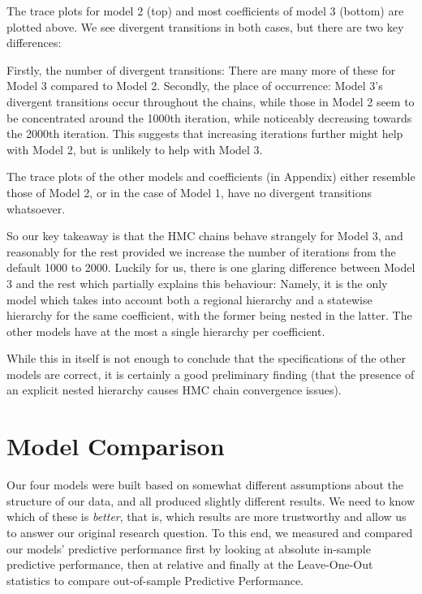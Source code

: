 \documentclass[12pt]{article}
\begin{document}
The trace plots for model 2 (top) and most coefficients of model 3 (bottom) are plotted above. We see divergent transitions in both cases, but there are two key differences:

Firstly, the number of divergent transitions: There are many more of these for Model 3 compared to Model 2. Secondly, the place of occurrence: Model 3's divergent transitions occur throughout the chains, while those in Model 2 seem to be concentrated around the 1000th iteration, while noticeably decreasing towards the 2000th iteration. This suggests that increasing iterations further might help with Model 2, but is unlikely to help with Model 3.

The trace plots of the other models and coefficients (in Appendix) either resemble those of Model 2, or in the case of Model 1, have no divergent transitions whatsoever.

So our key takeaway is that the HMC chains behave strangely for Model 3, and reasonably for the rest provided we increase the number of iterations from the default 1000 to 2000. Luckily for us, there is one glaring difference between Model 3 and the rest which partially explains this behaviour: Namely, it is the only model which takes into account both a regional hierarchy and a statewise hierarchy for the same coefficient, with the former being nested in the latter. The other models have at the most a single hierarchy per coefficient. 

While this in itself is not enough to conclude that the specifications of the other models are correct, it is certainly a good preliminary finding (that the presence of an explicit nested hierarchy causes HMC chain convergence issues). 


\section{Model Comparison} \label{sec:comparison}


Our four models were built based on somewhat different assumptions about the structure of our data, and all produced slightly different results. We need to know which of these is \textit{better}, that is, which results are more trustworthy and allow us to answer our original research question.
To this end, we measured and compared our models' predictive performance first by looking at absolute in-sample predictive performance, then at relative and finally at the Leave-One-Out statistics to compare out-of-sample Predictive Performance.
\end{document}
